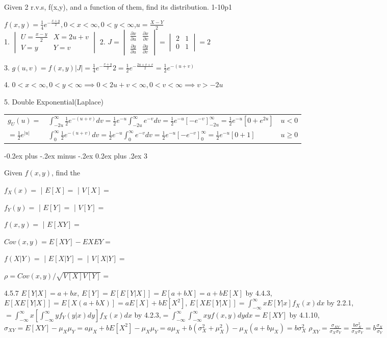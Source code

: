 \documentclass[10pt,landscape]{article}
\makeatletter
\renewcommand{\subsection}{\@startsection{subsection}{2}{0mm}%
                                {-0.2ex plus -.2ex minus -.2ex}%
                                {0.2ex plus .2ex}%
                                {\normalfont\normalsize\bfseries}}
\makeatother
\begin{document}
\begin{multicols}{1}
Given 2 r.v.s, f(x,y), and a function of them, find its distribution. 1-10p1


$f(x,y)=\frac14e^{-\frac{x+y}2}, 0<x<\infty,0<y<\infty$,$u=\frac{X-Y}2$\\
1. $\begin{vmatrix}U=\frac{x-y}2 & X=2u+v \\ V=y & Y=v \end{vmatrix}$
2. $J=\begin{vmatrix}\frac{\partial x}{\partial u} & \frac{\partial x}{\partial v} \\ \frac{\partial y}{\partial u} & \frac{\partial y}{\partial v} \end{vmatrix}=\begin{vmatrix}2 & 1 \\ 0 & 1 \end{vmatrix}=2$

3. $g(u,v)=f(x,y)|J|=\frac14e^{-\frac{x+y}2}2=\frac12e^{-\frac{2u+v+v}2}=\frac12e^{-(u+v)}$

4. $0<x<\infty,0<y<\infty\implies0<2u+v<\infty,0<v<\infty\implies v>-2u$

5. Double Exponential(Laplace)
\begin{tabular}{ l|l|l }
$g_U(u)=$ & $\int_{-2u}^\infty\frac12e^{-(u+v)}dv=\frac12e^{-u}\int_{-2u}^\infty e^{-v}dv=\frac12e^{-u}\left[-e^{-v}\right]_{-2u}^\infty=\frac12e^{-u}\left[0+e^{2u}\right]$ & $u<0$ \\
$=\frac12e^{|u|}$ & $\int_{0}^\infty\frac12e^{-(u+v)}dv=\frac12e^{-u}\int_{0}^\infty e^{-v}dv=\frac12e^{-u}\left[-e^{-v}\right]_{0}^\infty=\frac12e^{-u}\left[0+1\right]$ & $u\ge0$
\end{tabular}

\subsection{3 }

Given $f(x,y)$, find the 

$f_X(x)=$ | $E[X]=$ | $V[X]=$ 

$f_Y(y)=$ | $E[Y]=$ | $V[Y]=$ 

$f(x,y)=$ | $E[XY]=$

$Cov(x,y)=E[XY]-EXEY=$ 

$f(X|Y)=$ | $E[X|Y]=$ | $V[X|Y]=$

$\rho= Cov(x,y)/\sqrt{V[X]V[Y]}=$

4.5.7 $E[Y|X]=a+bx$, $E[Y]=E[E[Y|X]]=E[a+bX]=a+bE[X]$ by 4.4.3, $E[XE[Y|X]]=E[X(a+bX)]=aE[X]+bE[X^2]$, $E[XE[Y|X]]=\int_{-\infty}^{\infty}xE[Y|x]f_X(x)dx$ by 2.2.1, $=\int_{-\infty}^{\infty}x\left[\int_{-\infty}^{\infty}yf_Y(y|x)dy\right]f_X(x)dx$ by 4.2.3,$=\int_{-\infty}^{\infty}\int_{-\infty}^{\infty}xyf(x,y)dydx=E[XY]$ by 4.1.10, $\sigma_{XY}=E[XY]-\mu_X\mu_Y=a\mu_X+bE[X^2]-\mu_X\mu_Y=a\mu_X+b(\sigma_X^2+\mu_X^2)-\mu_X(a+b\mu_X)=b\sigma_X^2$
$\rho_{XY}=\frac{\sigma_{XY}}{\sigma_{X}\sigma_{Y}}=\frac{b\sigma_X^2}{\sigma_{X}\sigma_{Y}}=b\frac{\sigma_X}{\sigma_Y}$


\end{multicols}
\end{document}
